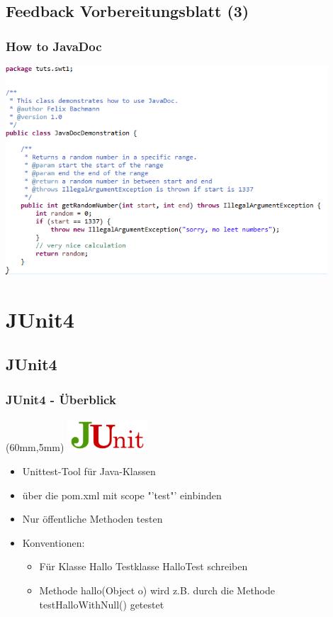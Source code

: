 \documentclass[18pt]{beamer}
\begin{document}
	\subsection{Feedback Vorbereitungsblatt (3)}
	\begin{frame}
		\frametitle{How to JavaDoc}
		\includegraphics[width=0.9\textwidth, scale=1.0]{./pics/tut0/javadoc-demo.png}
	\end{frame}
			
\section{JUnit4}	
	\subsection{JUnit4}
	\begin{frame}
		\frametitle{JUnit4 - Überblick}
		\begin{textblock*}{20mm}(60mm,5mm)
			\includegraphics[width=30mm, scale=0.8]{./pics/tut0/junit-logo.png}
		\end{textblock*}
		\begin{itemize}
			\item Unittest-Tool für Java-Klassen
			\item über die pom.xml mit scope "'test"' einbinden
			\item Nur öffentliche Methoden testen
			\item Konventionen:
			 \begin{itemize}
			 		\item Für Klasse Hallo Testklasse HalloTest schreiben
			 		\item Methode hallo(Object o) wird z.B. durch die Methode testHalloWithNull() getestet
			 \end{itemize}
		\end{itemize}
	\end{frame}	
	
\end{document}
